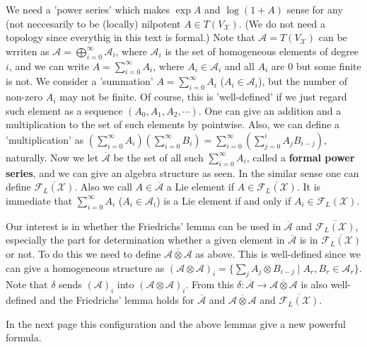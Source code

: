 \documentclass{article}
\newcommand{\SBar}{\;|\;}
\begin{document}
We need a 'power series' which makes $\exp{A}$ and $\log{(1 + A)}$ sense for any (not neccesarily to be (locally) nilpotent $A \in T(V_{\mathcal{X}})$.
(We do not need a topology since everythig in this text is formal.)
Note that $\mathcal{A} = T(V_\mathcal{X})$ can be wrriten as $\mathcal{A} = \bigoplus_{i = 0}^\infty \mathcal{A}_i$, where $\mathcal{A}_i$ is the set of homogeneous elements of degree $i$, and we can write $A = \sum_{i = 0}^\infty A_i$, where $A_i \in \mathcal{A}_i$ and all $A_i$ are 0 but some finite is not.
We consider a 'summation' $A = \sum_{i = 0}^\infty A_i$ ($A_i \in \mathcal{A}_i$), but the number of non-zero $A_i$ may not be finite.
Of course, this is 'well-defined' if we just regard such element as a sequence $(A_0, A_1, A_2, \cdots)$.
One can give an addition and a multiplication to the set of such elements by pointwise.
Also, we can define a 'multiplication' as $(\sum_{i = 0}^\infty A_i) (\sum_{i = 0}^\infty B_i) = \sum_{i = 0}^\infty (\sum_{j = 0}^i A_j B_{i - j})$, naturally.
Now we let $\overline{\mathcal{A}}$ be the set of all such $\sum_{i = 0}^\infty A_i$, called a \textbf{formal power series}, and we can give an algebra structure as seen.
In the similar sense one can define $\overline{\mathcal{F}_L(\mathcal{X})}$.
Also we call $A \in \overline{\mathcal{A}}$ a Lie element if $A \in \overline{\mathcal{F}_L(\mathcal{X})}$.
It is immediate that $\sum_{i = 0}^\infty A_i$ ($A_i \in \mathcal{A}_i$) is a Lie element if and only if $A_i \in \mathcal{F}_L(\mathcal{X})$.

Our interest is in whether the Friedrichs' lemma can be used in $\overline{\mathcal{A}}$ and $\overline{\mathcal{F}_L(\mathcal{X})}$, especially the part for determination whether a given element in $\overline{\mathcal{A}}$ is in $\overline{\mathcal{F}_L(\mathcal{X})}$ or not.
To do this we need to define $\overline{\mathcal{A} \otimes \mathcal{A}}$ as above.
This is well-defined since we can give a homogeneous structure as $(\mathcal{A} \otimes \mathcal{A})_i = \{\sum_j A_j \otimes B_{i - j} \SBar A_r, B_r \in \mathcal{A}_r\}$.
Note that $\delta$ sends $(\mathcal{A})_i$ into $(\mathcal{A} \otimes \mathcal{A})_i$.
From this $\delta : \overline{\mathcal{A}} \to \overline{\mathcal{A} \otimes \mathcal{A}}$ is also well-defined and the Friedrichs' lemma holds for $\overline{\mathcal{A}}$ and $\overline{\mathcal{A} \otimes \mathcal{A}}$ and $\overline{\mathcal{F}_L(\mathcal{X})}$.

In the next page this configuration and the above lemmas give a new powerful formula.
\end{document}
